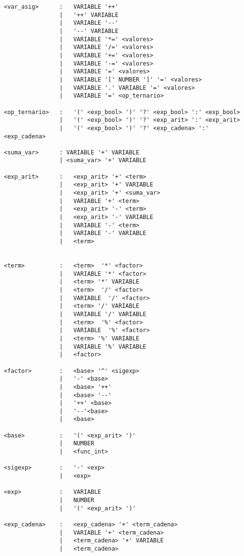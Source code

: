 \begin{verbatim}
<var_asig>      :   VARIABLE '++'
                |   '++' VARIABLE
                |   VARIABLE '--'
                |   '--' VARIABLE
                |   VARIABLE '*=' <valores>
                |   VARIABLE '/=' <valores>
                |   VARIABLE '+=' <valores>
                |   VARIABLE '-=' <valores>
                |   VARIABLE '=' <valores>
                |   VARIABLE '[' NUMBER ']' '=' <valores>
                |   VARIABLE '.' VARIABLE '=' <valores>
                |   VARIABLE '=' <op_ternario>

<op_ternario>   :   '(' <exp_bool> ')' '?' <exp_bool> ':' <exp_bool>
                |   '(' <exp_bool> ')' '?' <exp_arit> ':' <exp_arit>
                |   '(' <exp_bool> ')' '?' <exp_cadena> ':' <exp_cadena>

<suma_var>      : VARIABLE '+' VARIABLE
                | <suma_var> '+' VARIABLE

<exp_arit>      :   <exp_arit> '+' <term>
                |   <exp_arit> '+' VARIABLE
                |   <exp_arit> '+' <suma_var>
                |   VARIABLE '+' <term>
                |   <exp_arit> '-' <term>
                |   <exp_arit> '-' VARIABLE
                |   VARIABLE '-' <term>
                |   VARIABLE '-' VARIABLE
                |   <term>


<term>          :   <term>  '*' <factor>
                |   VARIABLE '*' <factor>
                |   <term> '*' VARIABLE
                |   <term>  '/' <factor>
                |   VARIABLE  '/' <factor>
                |   <term> '/' VARIABLE
                |   VARIABLE '/' VARIABLE
                |   <term>  '%' <factor>
                |   VARIABLE  '%' <factor>
                |   <term> '%' VARIABLE
                |   VARIABLE '%' VARIABLE
                |   <factor>

<factor>        :   <base> '^' <sigexp>
                |   '-' <base> 
                |   <base> '++'
                |   <base> '--'
                |   '++' <base>
                |   '--'<base>
                |   <base>

<base>          :   '(' <exp_arit> ')'
                |   NUMBER
                |   <func_int>

<sigexp>        :   '-' <exp>
                |   <exp>

<exp>           :   VARIABLE
                |   NUMBER
                |   '(' <exp_arit> ')'

<exp_cadena>    :   <exp_cadena> '+' <term_cadena>
                |   VARIABLE '+' <term_cadena>
                |   <term_cadena> '+' VARIABLE
                |   <term_cadena> 


\end{verbatim}
